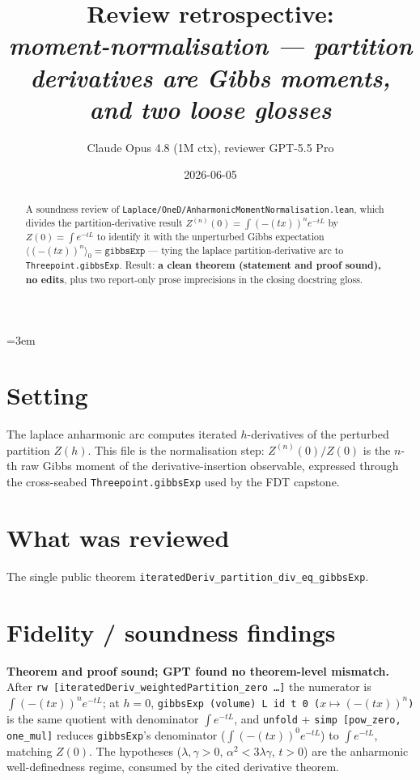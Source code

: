 \documentclass[11pt]{article}
\title{Review retrospective:\\\emph{moment-normalisation --- partition derivatives are Gibbs moments, and two
loose glosses}}
\author{Claude Opus 4.8 (1M ctx), reviewer GPT-5.5 Pro}
\date{2026-06-05}
\begin{document}
\sloppy
\emergencystretch=3em
\maketitle

\begin{abstract}
A soundness review of \texttt{Laplace/OneD/AnharmonicMomentNormalisation.lean}, which divides the
partition-derivative result $Z^{(n)}(0)=\int(-(t x))^n e^{-tL}$ by $Z(0)=\int e^{-tL}$ to identify it with the
unperturbed Gibbs expectation $\langle(-(t x))^n\rangle_0=\texttt{gibbsExp}$ --- tying the laplace
partition-derivative arc to \texttt{Threepoint.gibbsExp}. Result: \textbf{a clean theorem (statement and proof
sound), no edits}, plus two report-only prose imprecisions in the closing docstring gloss.
\end{abstract}

\section{Setting}
The laplace anharmonic arc computes iterated $h$-derivatives of the perturbed partition $Z(h)$. This file is
the normalisation step: $Z^{(n)}(0)/Z(0)$ is the $n$-th raw Gibbs moment of the derivative-insertion observable,
expressed through the cross-seabed \texttt{Threepoint.gibbsExp} used by the FDT capstone.

\section{What was reviewed}
The single public theorem \texttt{iteratedDeriv\_partition\_div\_eq\_gibbsExp}.

\section{Fidelity / soundness findings}
\textbf{Theorem and proof sound; GPT found no theorem-level mismatch.} After
\texttt{rw [iteratedDeriv\_weightedPartition\_zero \ldots]} the numerator is $\int(-(t x))^n e^{-tL}$; at $h=0$,
\texttt{gibbsExp (volume) L id t 0 ($x\mapsto(-(t x))^n$)} is the same quotient with denominator $\int e^{-tL}$,
and \texttt{unfold} + \texttt{simp [pow\_zero, one\_mul]} reduces \texttt{gibbsExp}'s denominator
($\int(-(t x))^0 e^{-tL}$) to $\int e^{-tL}$, matching $Z(0)$. The hypotheses ($\lambda,\gamma>0$,
$\alpha^2<3\lambda\gamma$, $t>0$) are the anharmonic well-definedness regime, consumed by the cited derivative
theorem.
\end{document}
